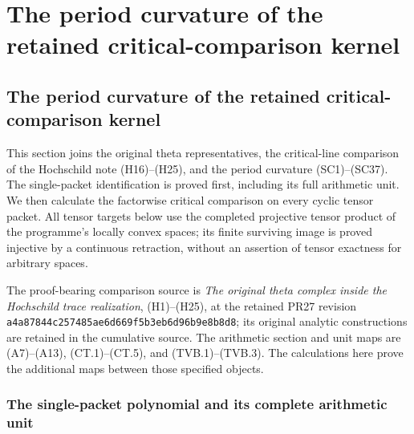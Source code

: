 \begingroup

\section{The period curvature of the retained critical-comparison kernel}


\subsection{The period curvature of the retained critical-comparison kernel}
\label{sec:period-critical-kernel-bridge}

This section joins the original theta representatives, the critical-line
comparison of the Hochschild note (H16)--(H25), and the period curvature
(SC1)--(SC37).  The single-packet identification is proved first, including
its full arithmetic unit.  We then calculate the factorwise critical
comparison on every cyclic tensor packet.  All tensor targets below use
the completed projective tensor product of the programme's locally convex
spaces; its finite surviving image is proved injective by a continuous
retraction, without an assertion of tensor exactness for arbitrary spaces.

The proof-bearing comparison source is
\emph{The original theta complex inside the Hochschild trace realization},
(H1)--(H25), at the retained PR27 revision
\nolinkurl{a4a87844c257485ae6d669f5b3eb6d96b9e8b8d8}; its original
analytic constructions are retained in the cumulative source.
The arithmetic section and unit maps are (A7)--(A13), (CT.1)--(CT.5),
and (TVB.1)--(TVB.3).  The calculations here prove the additional maps
between those specified objects.

\subsubsection{The single-packet polynomial and its complete arithmetic unit}

